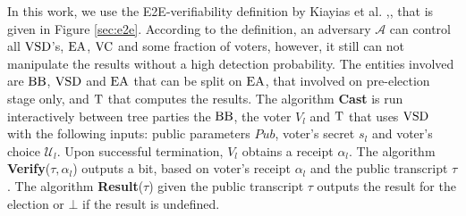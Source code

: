  In this work, we use the E2E-verifiability definition by Kiayias et al. \cite{Kiayias2015a},\cite{Kiayias2015}, that is given in Figure \ref{sec:e2e}. 
According to the definition, an adversary $\mathcal{A}$ can control all $\operatorname{VSD}$'s, $\operatorname{EA}$, $\operatorname{VC}$ and some fraction of voters, however, it still can not manipulate the results without a high detection probability.  The entities involved are $\operatorname{BB}$, $\operatorname{VSD}$ and $\operatorname{EA}$ that can be split on $\operatorname{EA}$, that involved on pre-election stage only, and $\operatorname{T}$ that computes the results. The algorithm \textbf{Cast} is run interactively between tree parties the $\operatorname{BB}$, the voter $V_l$ and $\operatorname{T}$ that uses $\operatorname{VSD}$ with the following inputs: public parameters $Pub$, voter's secret $s_l$ and voter's choice $\mathcal{U}_l$. Upon successful termination, $V_l$ obtains a receipt $\alpha_l$. The algorithm \textbf{Verify}($\tau,\alpha_l$) outputs a bit, based on voter's receipt $\alpha_l$ and the public transcript $\tau$. The algorithm \textbf{Result}($\tau$) given the public transcript $\tau$  outputs the result for the election or $\bot$ if the result is undefined.\\
